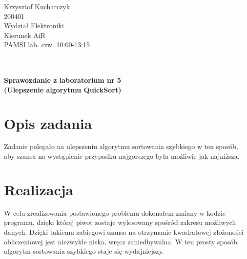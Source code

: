 \documentclass[a4paper,12pt]{article}
\begin{document}
{\raggedleft{}Krzysztof Kucharczyk}\\200401\\Wydział Elektroniki\\Kierunek AiR
\\PAMSI lab. czw. 10:00-13:15\\\\\\
\begin{center} 
	\textbf{Sprawozdanie z laboratorium nr 5\\(Ulepszenie algorytmu QuickSort)}
\end{center}

\section{Opis zadania}

Zadanie polegało na ulepszeniu algorytmu sortowania szybkiego w ten sposób, aby szansa na 
wystąpienie przypadku najgorszego była możliwie jak najniższa. 
\section{Realizacja}
W celu zrealizowania postawionego problemu dokonałem zmiany w kodzie programu, dzięki której piwot zostaje wylosowany
spośród zakresu możliwych danych. Dzięki takiemu zabiegowi szansa na otrzymanie kwadratowej złożoności obliczeniowej 
jest niezwykle niska, wręcz zaniedbywalna. W ten prosty sposób algorytm sortowania szybkiego staje się wydajniejszy.
\end{document}
